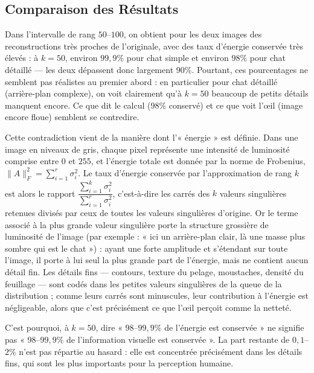 \documentclass[12pt]{report}
\begin{document}
\subsection*{Comparaison des Résultats}
\noindent Dans l'intervalle de rang $50$--$100$, on obtient pour les deux images des reconstructions très proches de l'originale, avec des taux d'énergie conservée très élevés : à $k=50$, environ $99{,}9\%$ pour {chat simple} et environ $98\%$ pour {chat détaillé} --- les deux dépassent donc largement $90\%$. Pourtant, ces pourcentages ne semblent pas réalistes au premier abord : en particulier pour {chat détaillé} (arrière-plan complexe), on voit clairement qu'à $k=50$ beaucoup de petits détails manquent encore. Ce que dit le calcul ($98\%$ conservé) et ce que voit l'œil (image encore floue) semblent se contredire.

\vspace{0.3cm}
\noindent Cette contradiction vient de la manière dont l'« énergie » est définie. Dans une image en niveaux de gris, chaque pixel représente une intensité de luminosité comprise entre $0$ et $255$, et l'énergie totale est donnée par la norme de Frobenius, $\|A\|_F^2 = \sum_{i=1}^{r} \sigma_i^2$. Le {taux d'énergie conservée} par l'approximation de rang $k$ est alors le rapport $\dfrac{\sum_{i=1}^{k}\sigma_i^2}{\sum_{i=1}^{r}\sigma_i^2}$, c'est-à-dire les carrés des $k$ valeurs singulières {retenues} divisés par ceux de {toutes} les valeurs singulières d'origine. Or le terme associé à la plus grande valeur singulière porte la structure grossière de luminosité de l'image (par exemple : « ici un arrière-plan clair, là une masse plus sombre qui est le chat ») : ayant une forte amplitude et s'étendant sur toute l'image, il porte à lui seul la plus grande part de l'énergie, mais ne contient aucun détail fin. Les détails fins --- contours, texture du pelage, moustaches, densité du feuillage --- sont codés dans les petites valeurs singulières de la queue de la distribution ; comme leurs carrés sont minuscules, leur contribution à l'énergie est négligeable, alors que c'est précisément ce que l'œil perçoit comme la netteté.

\vspace{0.3cm}
\noindent C'est pourquoi, à $k=50$, dire « $98$--$99{,}9\%$ de l'énergie est conservée » ne signifie pas « $98$--$99{,}9\%$ de l'information visuelle est conservée ». La part restante de $0{,}1$--$2\%$ n'est pas répartie au hasard : elle est concentrée précisément dans les détails fins, qui sont les plus importants pour la perception humaine.
\end{document}
